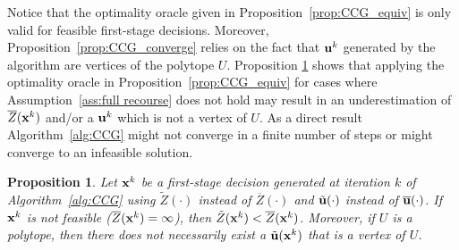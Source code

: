 \documentclass[12pt,x11names]{article}
\newtheorem{proposition}{Proposition} %
\theoremstyle{definition}
\newcommand{\bu}{{\bf u}}
\newcommand{\bx}{{\bf x}}
\begin{document}
Notice that the optimality oracle given in Proposition~\ref{prop:CCG_equiv} is only valid for feasible first-stage decisions. Moreover, Proposition~\ref{prop:CCG_converge} relies on the fact that $\bu^k$ generated by the algorithm are vertices of the polytope $U$. Proposition \ref{prop:CCG_Limitation} shows that applying the optimality oracle in Proposition~\ref{prop:CCG_equiv} for cases where Assumption~\ref{ass:full recourse} does not hold may result in an underestimation of $\overline{Z}(\bx^k)$ and/or a $\bu^k$ which is not a vertex of $U$. As a direct result Algorithm~\ref{alg:CCG} might not converge in a finite number of steps or might converge to an infeasible solution.
\begin{proposition}\label{prop:CCG_Limitation}
Let $\bx^k$ be a first-stage decision generated at iteration $k$ of Algorithm~\ref{alg:CCG} using $\tilde{Z}(\cdot)$ instead of $\overline{Z}(\cdot)$ and $\tilde{\bu}(\cdot)$ instead of $\overline{\bu}(\cdot)$. If $\bx^k$ is not feasible ($\overline{Z}(\bx^k)=\infty$), then $\tilde{Z}(\bx^k)<\overline{Z}(\bx^k)$.
Moreover, if $U$ is a polytope, then there does not necessarily exist a $\tilde{\bu}(\bx^k)$ that is a vertex of $U$.
\end{proposition}
\end{document}
